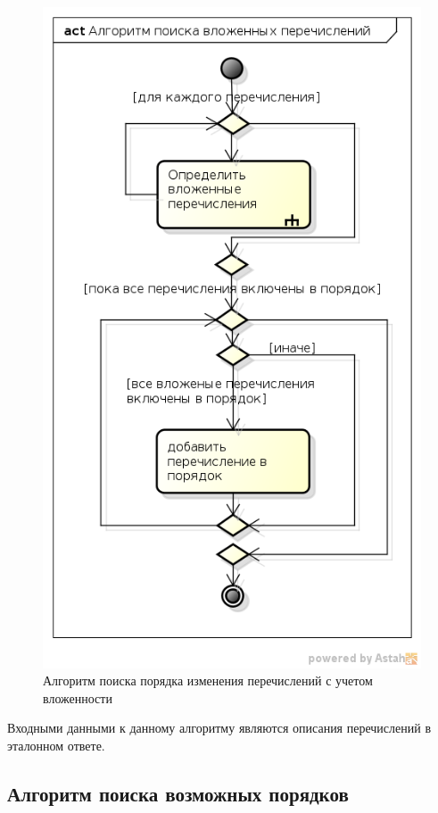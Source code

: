 \documentclass[a4paper,english,russian]{G2-105}
\begin{document}
\begin{figure}
    \center \includegraphics[height = 0.5\paperheight]{apvp.png}
    \caption{Алгоритм поиска порядка изменения перечислений с учетом вложенности}
	\label{apvp}
\end{figure}
\par Входными данными к данному алгоритму являются описания перечислений в эталонном ответе.

\subsection{Алгоритм поиска возможных порядков}
\end{document}
